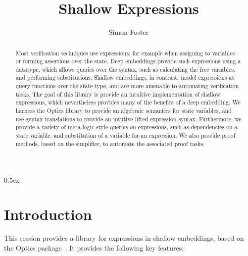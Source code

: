 \documentclass[11pt,a4paper]{article}
\begin{document}
\title{Shallow Expressions}
\author{Simon Foster}
\maketitle

\begin{abstract}
\noindent Most verification techniques use expressions, for example when assigning to variables or 
forming assertions over the state. Deep embeddings provide such expressions using a datatype, which 
allows queries over the syntax, such as calculating the free variables, and performing substitutions. 
Shallow embeddings, in contrast, model expressions as query functions over the state type, and are 
more amenable to automating verification tasks. The goal of this library is provide an intuitive 
implementation of shallow expressions, which nevertheless provides many of the benefits of a deep 
embedding. We harness the Optics library to provide an algebraic semantics for state variables,
and use syntax translations to provide an intutive lifted expression syntax. Furthermore, we
provide a variety of meta-logic-style queries on expressions, such as dependencies
on a state variable, and substitution of a variable for an expression. We also provide proof 
methods, based on the simplifier, to automate the associated proof tasks.
\end{abstract}

\tableofcontents

\parindent 0pt\parskip 0.5ex

\section{Introduction}

This session provides a library for expressions in shallow embeddings, based on the Optics
package~\cite{Optics-AFP}. It provides the following key features:
\end{document}
